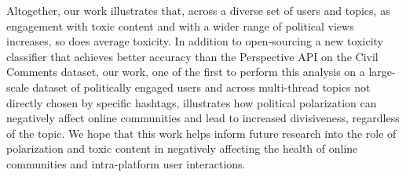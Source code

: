\vspace{3pt}
\noindent
Altogether, our work illustrates that, across a diverse set of users and topics, as engagement with toxic content and with a wider range of political views increases, so does average toxicity. In addition to open-sourcing a new toxicity classifier that achieves better accuracy than the Perspective API on the Civil Comments dataset, our work, one of the first to perform this analysis on a large-scale dataset of politically engaged users and across multi-thread topics not directly chosen by specific hashtags, illustrates how political polarization can negatively affect online communities and lead to increased divisiveness, regardless of the topic. We hope that this work helps inform future research into the role of polarization and toxic content in negatively affecting the health of online communities and intra-platform user interactions. 